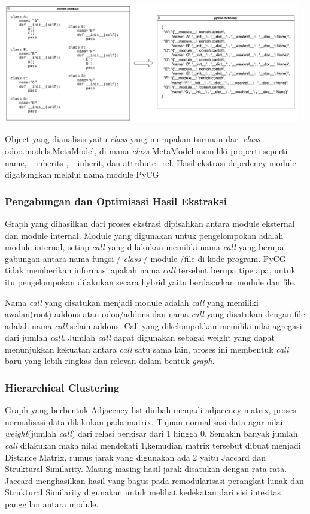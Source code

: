 \begin{center}
	\includegraphics[width=13cm]{img/bab_3/inspectSample.png}
	\label{contoh_json_pycg}
\end{center}

Object yang dianalisis yaitu \textit{class} yang merupakan turunan dari \textit{class} odoo.models.MetaModel, di mana \textit{class} MetaModel memiliki properti seperti  name, \_inherits , \_inherit, dan attribute\_rel. Hasil ekstrasi depedency module digabungkan melalui nama module PyCG 
\\
\subsubsection{Pengabungan dan Optimisasi Hasil Ekstraksi}
Graph yang dihasilkan dari proses ekstrasi dipisahkan antara module eksternal dan module internal. Module yang digunakan untuk pengelompokan adalah module internal, setiap \textit{call} yang dilakukan memiliki nama \textit{call} yang berupa gabungan antara nama fungsi / \textit{class} / module /file di kode program. PyCG tidak memberikan informasi apakah nama \textit{call} tersebut berupa tipe apa, untuk itu pengelompokan dilakukan secara hybrid yaitu berdasarkan module dan file. 

Nama \textit{call} yang disatukan menjadi module adalah \textit{call} yang memiliki awalan(root) addons atau odoo/addons dan nama \textit{call} yang disatukan dengan file adalah nama \textit{call} selain addons. Call yang dikelompokkan memiliki nilai agregasi dari jumlah \textit{call}. Jumlah \textit{call} dapat digunakan sebagai weight yang dapat menunjukkan kekuatan antara \textit{call} satu sama lain, proses ini membentuk \textit{call} baru yang lebih ringkas dan relevan dalam bentuk \textit{graph}. 

\subsubsection{Hierarchical Clustering}
Graph yang berbentuk Adjacency list diubah menjadi adjacency matrix, proses normalisasi data dilakukan pada matrix. Tujuan normalisasi data agar nilai \textit{weight}(jumlah \textit{call}) dari relasi berkisar dari 1 hingga 0. Semakin banyak jumlah \textit{call} dilakukan maka nilai mendekati 1,kemudian matrix tersebut dibuat menjadi Distance Matrix, rumus jarak yang digunakan ada 2 yaitu Jaccard dan Struktural Similarity. Masing-masing hasil jarak disatukan dengan rata-rata. Jaccard menghasilkan hasil yang bagus pada remodularisasi perangkat lunak dan Struktural Similarity digunakan untuk melihat kedekatan dari sisi intesitas panggilan antara module.

